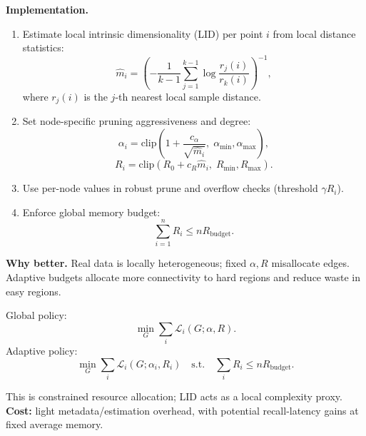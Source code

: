 \documentclass[11pt]{article}
\begin{document}
\textbf{Implementation.}
\begin{enumerate}
    \item Estimate local intrinsic dimensionality (LID) per point $i$ from local distance statistics:
    \begin{equation}
    \widehat{m}_i = \left(-\frac{1}{k-1}\sum_{j=1}^{k-1}\log\frac{r_j(i)}{r_k(i)}\right)^{-1},
    \end{equation}
    where $r_j(i)$ is the $j$-th nearest local sample distance.
    \item Set node-specific pruning aggressiveness and degree:
    \begin{equation}
    \alpha_i = \mathrm{clip}\left(1+\frac{c_\alpha}{\sqrt{\widehat{m}_i}},\;\alpha_{\min},\alpha_{\max}\right),
    \end{equation}
    \begin{equation}
    R_i = \mathrm{clip}\left(R_0 + c_R\widehat{m}_i,\;R_{\min},R_{\max}\right).
    \end{equation}
    \item Use per-node values in robust prune and overflow checks (threshold $\gamma R_i$).
    \item Enforce global memory budget:
    \begin{equation}
    \sum_{i=1}^n R_i \le nR_{\text{budget}}.
    \end{equation}
\end{enumerate}

\textbf{Why better.} Real data is locally heterogeneous; fixed $\alpha,R$ misallocate edges. Adaptive budgets allocate more connectivity to hard regions and reduce waste in easy regions.

Global policy:
\begin{equation}
\min_G \sum_i \mathcal{L}_i(G;\alpha,R).
\end{equation}
Adaptive policy:
\begin{equation}
\min_G \sum_i \mathcal{L}_i(G;\alpha_i,R_i)
\quad\text{s.t.}\quad
\sum_i R_i \le nR_{\text{budget}}.
\end{equation}

This is constrained resource allocation; LID acts as a local complexity proxy. \textbf{Cost:} light metadata/estimation overhead, with potential recall-latency gains at fixed average memory.
\end{document}
